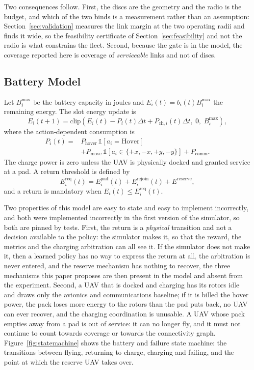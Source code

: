 \documentclass[conference]{IEEEtran}
\begin{document}
Two consequences follow. First, the discs are the geometry and the radio is the budget, and which of the two binds is a measurement rather than an assumption: Section~\ref{sec:validation} measures the link margin at the two operating radii and finds it wide, so the feasibility certificate of Section~\ref{sec:feasibility} and not the radio is what constrains the fleet. Second, because the gate is in the model, the coverage reported here is coverage of \emph{serviceable} links and not of discs.

\subsection{Battery Model}
Let $B_i^{\max}$ be the battery capacity in joules and $E_i(t)=b_i(t)B_i^{\max}$ the remaining energy. The slot energy update is
\begin{equation}
E_i(t+1)=\mathrm{clip}\!\left(E_i(t)-P_i(t)\Delta t+P_{\mathrm{ch},i}(t)\Delta t,\;0,\;B_i^{\max}\right),
\label{eq:battery}
\end{equation}
where the action-dependent consumption is
\begin{equation}
\begin{split}
P_i(t)={}&P_{\mathrm{hover}}\,\mathbb 1[a_i=\mathrm{Hover}]\\
&+P_{\mathrm{move}}\,\mathbb 1[a_i\in\{+x,-x,+y,-y\}]+P_{\mathrm{comm}}.
\end{split}
\label{eq:power}
\end{equation}
The charge power is zero unless the UAV is physically docked and granted service at a pad. A return threshold is defined by
\begin{equation}
E_i^{\mathrm{req}}(t)=E_i^{\mathrm{pad}}(t)+E_i^{\mathrm{rejoin}}(t)+E^{\mathrm{reserve}},
\label{eq:ereq}
\end{equation}
and a return is mandatory when $E_i(t)\le E_i^{\mathrm{req}}(t)$.

Two properties of this model are easy to state and easy to implement incorrectly, and both were implemented incorrectly in the first version of the simulator, so both are pinned by tests. First, the return is a \emph{physical} transition and not a decision available to the policy: the simulator makes it, so that the reward, the metrics and the charging arbitration can all see it. If the simulator does not make it, then a learned policy has no way to express the return at all, the arbitration is never entered, and the reserve mechanism has nothing to recover, the three mechanisms this paper proposes are then present in the model and absent from the experiment. Second, a UAV that is docked and charging has its rotors idle and draws only the avionics and communications baseline; if it is billed the hover power, the pack loses more energy to the rotors than the pad puts back, no UAV can ever recover, and the charging coordination is unusable. A UAV whose pack empties away from a pad is out of service: it can no longer fly, and it must not continue to count towards coverage or towards the connectivity graph. Figure~\ref{fig:statemachine} shows the battery and failure state machine: the transitions between flying, returning to charge, charging and failing, and the point at which the reserve UAV takes over.
\end{document}

